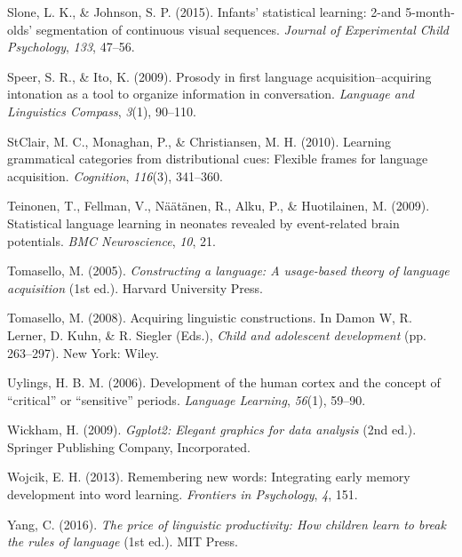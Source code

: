 \documentclass[
  english,
  man,mask,floatsintext]{apa6}
\begin{document}
\leavevmode\hypertarget{ref-slone2015infants}{}%
Slone, L. K., \& Johnson, S. P. (2015). Infants' statistical learning: 2-and 5-month-olds' segmentation of continuous visual sequences. \emph{Journal of Experimental Child Psychology}, \emph{133}, 47--56.

\leavevmode\hypertarget{ref-speer2009prosody}{}%
Speer, S. R., \& Ito, K. (2009). Prosody in first language acquisition--acquiring intonation as a tool to organize information in conversation. \emph{Language and Linguistics Compass}, \emph{3}(1), 90--110.

\leavevmode\hypertarget{ref-clair2010learning}{}%
StClair, M. C., Monaghan, P., \& Christiansen, M. H. (2010). Learning grammatical categories from distributional cues: Flexible frames for language acquisition. \emph{Cognition}, \emph{116}(3), 341--360.

\leavevmode\hypertarget{ref-teinonen2009statistical}{}%
Teinonen, T., Fellman, V., Näätänen, R., Alku, P., \& Huotilainen, M. (2009). Statistical language learning in neonates revealed by event-related brain potentials. \emph{BMC Neuroscience}, \emph{10}, 21.

\leavevmode\hypertarget{ref-tomasello2003constructing}{}%
Tomasello, M. (2005). \emph{Constructing a language: A usage-based theory of language acquisition} (1st ed.). Harvard University Press.

\leavevmode\hypertarget{ref-tomasello2006acquiring}{}%
Tomasello, M. (2008). Acquiring linguistic constructions. In Damon W, R. Lerner, D. Kuhn, \& R. Siegler (Eds.), \emph{Child and adolescent development} (pp. 263--297). New York: Wiley.

\leavevmode\hypertarget{ref-uylings2006development}{}%
Uylings, H. B. M. (2006). Development of the human cortex and the concept of ``critical'' or ``sensitive'' periods. \emph{Language Learning}, \emph{56}(1), 59--90.

\leavevmode\hypertarget{ref-ggplot2}{}%
Wickham, H. (2009). \emph{Ggplot2: Elegant graphics for data analysis} (2nd ed.). Springer Publishing Company, Incorporated.

\leavevmode\hypertarget{ref-wojcik2013remembering}{}%
Wojcik, E. H. (2013). Remembering new words: Integrating early memory development into word learning. \emph{Frontiers in Psychology}, \emph{4}, 151.

\leavevmode\hypertarget{ref-yang2016price}{}%
Yang, C. (2016). \emph{The price of linguistic productivity: How children learn to break the rules of language} (1st ed.). MIT Press.

\endgroup


\end{document}
